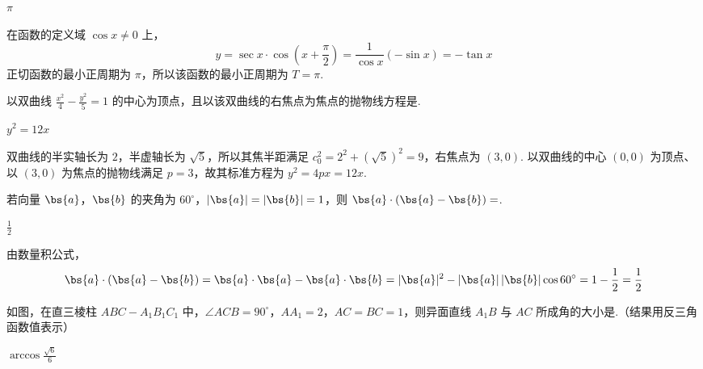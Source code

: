 \begin{answer}
\(\pi\)
\end{answer}

\begin{solution}
在函数的定义域 \(\cos x\neq0\) 上，
\[
y=\sec x\cdot\cos\left(x+\frac{\pi}{2}\right)=\frac{1}{\cos x}(-\sin x)=-\tan x
\]
正切函数的最小正周期为 \(\pi\)，所以该函数的最小正周期为 \(T=\pi\).
\end{solution}

\begin{problem}
以双曲线 \(\frac{x^2}{4} - \frac{y^2}{5} = 1\) 的中心为顶点，且以该双曲线的右焦点为焦点的抛物线方程是\fillinblank{}.
\end{problem}

\begin{answer}
\(y^2=12x\)
\end{answer}

\begin{solution}
双曲线的半实轴长为 \(2\)，半虚轴长为 \(\sqrt{5}\)，所以其焦半距满足 \(c_0^2=2^2+\left(\sqrt{5}\right)^2=9\)，右焦点为 \((3,0)\). 以双曲线的中心 \((0,0)\) 为顶点、以 \((3,0)\) 为焦点的抛物线满足 \(p=3\)，故其标准方程为 \(y^2=4px=12x\).
\end{solution}

\begin{problem}
若向量 \(\bs{a}\)，\(\bs{b}\) 的夹角为 \(60^{\circ}\)，\(|\bs{a}| = |\bs{b}| = 1\)，则 \(\bs{a} \cdot (\bs{a} - \bs{b}) =\)\fillinblank{}.
\end{problem}

\begin{answer}
\(\frac{1}{2}\)
\end{answer}

\begin{solution}
由数量积公式，
\[
\bs{a}\cdot(\bs{a}-\bs{b})=\bs{a}\cdot\bs{a}-\bs{a}\cdot\bs{b}=|\bs{a}|^2-|\bs{a}|\,|\bs{b}|\cos60^{\circ}=1-\frac{1}{2}=\frac{1}{2}
\]
\end{solution}

\begin{problem}
如图，在直三棱柱 \(ABC - A_{1}B_{1}C_{1}\) 中，\(\angle ACB = 90^{\circ}\)，\(AA_{1} = 2\)，\(AC = BC = 1\)，则异面直线 \(A_{1}B\) 与 \(AC\) 所成角的大小是\fillinblank{}.（结果用反三角函数值表示）

\end{problem}

\begin{answer}
\(\arccos\frac{\sqrt{6}}{6}\)
\end{answer}

